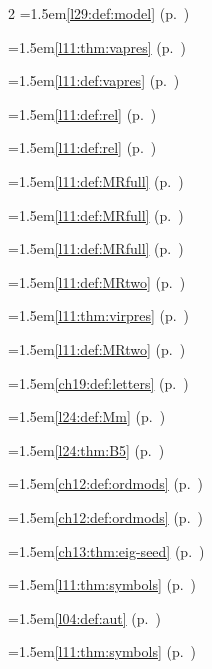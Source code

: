 \begin{multicols}{2}
\hangindent=1.5em\quad \ref{l29:def:model} (p.~\pageref{l29:def:model})\par
\hangindent=1.5em\quad \ref{l11:thm:vapres} (p.~\pageref{l11:thm:vapres})\par
\hangindent=1.5em\quad \ref{l11:def:vapres} (p.~\pageref{l11:def:vapres})\par
\hangindent=1.5em\quad \ref{l11:def:rel} (p.~\pageref{l11:def:rel})\par
\hangindent=1.5em\quad \ref{l11:def:rel} (p.~\pageref{l11:def:rel})\par
\hangindent=1.5em\quad \ref{l11:def:MRfull} (p.~\pageref{l11:def:MRfull})\par
\hangindent=1.5em\quad \ref{l11:def:MRfull} (p.~\pageref{l11:def:MRfull})\par
\hangindent=1.5em\quad \ref{l11:def:MRfull} (p.~\pageref{l11:def:MRfull})\par
\hangindent=1.5em\quad \ref{l11:def:MRtwo} (p.~\pageref{l11:def:MRtwo})\par
\hangindent=1.5em\quad \ref{l11:thm:virpres} (p.~\pageref{l11:thm:virpres})\par
\hangindent=1.5em\quad \ref{l11:def:MRtwo} (p.~\pageref{l11:def:MRtwo})\par
\hangindent=1.5em\quad \ref{ch19:def:letters} (p.~\pageref{ch19:def:letters})\par
\hangindent=1.5em\quad \ref{l24:def:Mm} (p.~\pageref{l24:def:Mm})\par
\hangindent=1.5em\quad \ref{l24:thm:B5} (p.~\pageref{l24:thm:B5})\par
\hangindent=1.5em\quad \ref{ch12:def:ordmods} (p.~\pageref{ch12:def:ordmods})\par
\hangindent=1.5em\quad \ref{ch12:def:ordmods} (p.~\pageref{ch12:def:ordmods})\par
\hangindent=1.5em\quad \ref{ch13:thm:eig-seed} (p.~\pageref{ch13:thm:eig-seed})\par
\hangindent=1.5em\quad \ref{l11:thm:symbols} (p.~\pageref{l11:thm:symbols})\par
\hangindent=1.5em\quad \ref{l04:def:aut} (p.~\pageref{l04:def:aut})\par
\hangindent=1.5em\quad \ref{l11:thm:symbols} (p.~\pageref{l11:thm:symbols})\par

\end{multicols}
